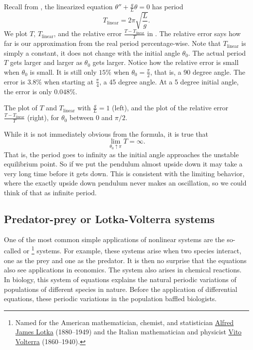 Recall from , the linearized equation $\theta''+\frac{g}{L}\theta
= 0$ has period
\begin{equation*}
T_{\text{linear}} = 2\pi \sqrt{\frac{L}{g}} .
\end{equation*}
We plot $T$, $T_{\text{linear}}$, and the relative error
$\frac{T-T_{\text{linear}}}{T}$ in .  The relative error
says how far is our approximation from the real period percentage-wise.
Note that $T_{\text{linear}}$ is simply a constant, it does not change with
the initial angle $\theta_0$.  The actual period $T$ gets larger and larger as
$\theta_0$ gets larger.
Notice how the relative error is small when $\theta_0$ is small.  It is
still only $15\%$ when $\theta_0 = \frac{\pi}{2}$, that is, a 90 degree
angle.  The error is $3.8\%$ when starting at $\frac{\pi}{4}$, 
a 45 degree angle.  At a 5 degree initial angle, the error is only $0.048 \%$.

\begin{myfig}
\capstart
\caption{The plot of $T$ and $T_{\text{linear}}$ with $\frac{g}{L} =
1$ (left), and the plot of the relative
error $\frac{T-T_{\text{linear}}}{T}$ (right), for $\theta_0$ between 0 and $\pi/2$. \label{fig:TvsT0}}
\end{myfig}

While it is not immediately obvious from the formula, it is true that
\begin{equation*}
\lim_{\theta_0 \uparrow \pi} T = \infty .
\end{equation*}
That is, the period goes to infinity as the initial angle approaches the
unstable equilibrium point.  So if we put the pendulum almost upside down it
may take a very long time before it gets down.  This is consistent with the
limiting behavior, where the exactly upside down pendulum never makes an
oscillation, so we could think of that as infinite period.

\subsection{Predator-prey or Lotka-Volterra systems}

One of the most common simple applications of nonlinear systems are the
so-called \emph{} or
\emph{}%
\footnote{Named for the American mathematician, chemist, and statistician
\href{https://en.wikipedia.org/wiki/Alfred_J._Lotka}{Alfred James Lotka}
(1880--1949) and the Italian mathematician and physicist
\href{https://en.wikipedia.org/wiki/Vito_Volterra}{Vito Volterra}
(1860--1940).}
systems.  For example, these systems arise 
when two species interact, one as the prey and one as the predator.  It is
then no surprise that the equations also see applications in economics.
The system also arises in chemical reactions.
In biology, this system of equations explains the natural periodic variations of populations of
different species in nature.  Before the application of differential
equations, these periodic variations in the population baffled biologists.

